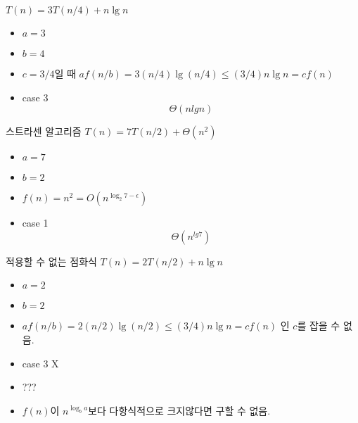 \documentclass[10pt]{beamer}
\begin{document}
\begin{frame}{ex}
    $T(n) = 3T(n/4) + n\lg n$ \pause
    \begin{itemize}
        \item $a = 3$ \pause
        \item $b = 4$ \pause
        \item $c = 3/4$일 때 $af(n/b) = 3(n/4) \lg(n/4) \le (3/4)n \lg n = cf(n)$ \pause
        \item case 3 \pause
        $$\Theta(nlg n)$$
    \end{itemize}
\end{frame}


\begin{frame}{스트라센 알고리즘}
    $T(n) = 7T(n/2) + \Theta(n^2)$ \pause

    \begin{itemize}
        \item $a = 7$ \pause
        \item $b = 2$ \pause
        \item $f(n) = n^2 = O(n ^{\log _2 7 - \epsilon})$ \pause
        \item case 1 \pause
        $$\Theta(n^{lg 7})$$
    \end{itemize}
\end{frame}


\begin{frame}{적용할 수 없는 점화식}
    $T(n) = 2T(n/2) + n\lg n$ \pause
    \begin{itemize}
        \item $a = 2$ \pause
        \item $b = 2$ \pause
        \item $af(n/b) = 2(n/2) \lg(n/2) \le (3/4)n \lg n = cf(n)$ 인 $c$를 잡을 수 없음.
        \item case 3 X
        \item ???
        \item $f(n)$이 $n^{\log_b a}$보다 다항식적으로 크지않다면 구할 수 없음.
    \end{itemize}
\end{frame}



\end{document}
